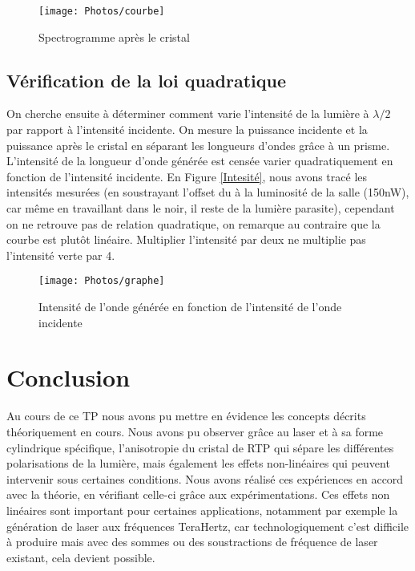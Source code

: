 \documentclass[a4paper,11pt]{report}
\begin{document}
\begin{figure}[H]
\centering
    \texttt{[image: Photos/courbe]}
    \caption{Spectrogramme après le cristal}
    \label{spectro}
\end{figure}

\section{Vérification de la loi quadratique}
On cherche ensuite à déterminer comment varie l'intensité de la lumière à $\lambda/2$ par rapport à l'intensité incidente. On mesure la puissance incidente et la puissance après le cristal en séparant les longueurs d'ondes grâce à un prisme. L'intensité de la longueur d'onde générée est censée varier quadratiquement en fonction de l'intensité incidente. En Figure \ref{Intesité}, nous avons tracé les intensités mesurées (en soustrayant l'offset du à la luminosité de la salle (150nW), car même en travaillant dans le noir, il reste de la lumière parasite), cependant on ne retrouve pas de relation quadratique, on remarque au contraire que la courbe est plutôt linéaire. Multiplier l'intensité par deux ne multiplie pas l'intensité verte par 4. 

\begin{figure}[H]
    \centering
    \texttt{[image: Photos/graphe]}
    \caption{Intensité de l'onde générée en fonction de l'intensité de l'onde incidente}
    \label{Intensité}
\end{figure}


\chapter*{Conclusion} 
Au cours de ce TP nous avons pu mettre en évidence les concepts décrits théoriquement en cours. Nous avons pu observer grâce au laser et à sa forme cylindrique spécifique, l'anisotropie du cristal de RTP qui sépare les différentes polarisations de la lumière, mais également les effets non-linéaires qui peuvent intervenir sous certaines conditions. Nous avons réalisé ces expériences en accord avec la théorie, en vérifiant celle-ci grâce aux expérimentations. Ces effets non linéaires sont important pour certaines applications, notamment par exemple la génération de laser aux fréquences TeraHertz, car technologiquement c'est difficile à produire mais avec des sommes ou des soustractions de fréquence de laser existant, cela devient possible.
\end{document}
